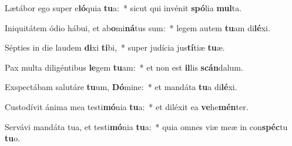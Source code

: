 \item Lætábor ego super e\textbf{ló}quia \textbf{tu}a:~* sicut qui invénit \textbf{spó}lia \textbf{mul}ta.
\item Iniquitátem ódio hábui, et ab\textbf{o}mi\textbf{ná}tus sum:~* legem autem \textbf{tu}am di\textbf{lé}xi.
\item Sépties in die laudem \textbf{di}xi \textbf{ti}bi,~* super judícia jus\textbf{tí}tiæ \textbf{tu}æ.
\item Pax multa diligéntibus \textbf{le}gem \textbf{tu}am:~* et non est \textbf{il}lis \textbf{scán}dalum.
\item Exspectábam salutáre \textbf{tu}um, \textbf{Dó}mine:~* et mandáta \textbf{tu}a di\textbf{lé}xi.
\item Custodívit ánima mea testi\textbf{mó}nia \textbf{tu}a:~* et diléxit ea \textbf{ve}he\textbf{mén}ter.
\item Servávi mandáta tua, et testi\textbf{mó}nia \textbf{tu}a:~* quia omnes viæ meæ in con\textbf{spéc}tu \textbf{tu}o.

